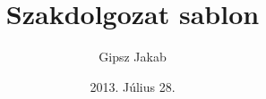 \documentclass[]{oe-kvk-szakdolgozat}
\author{Gipsz Jakab}
\title{Szakdolgozat sablon}
\date{2013. Július 28.}
\begin{document}
\lipsum
\lipsum
\lipsum
\end{document}
